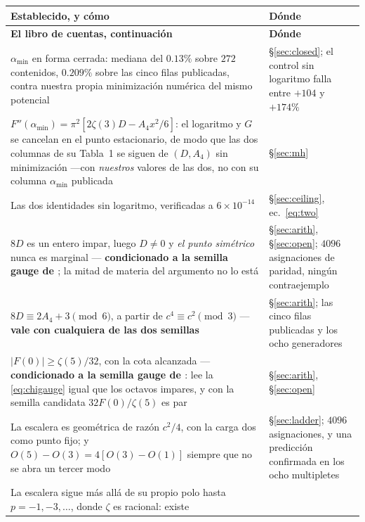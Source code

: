 \documentclass[11pt,a4paper]{article}
\newcommand{\amin}{\alpha_{\min}}
\begin{document}
\begin{longtable}{p{}p{}}
\toprule
\rowcolor{okgreen!12}\textbf{Establecido, y cómo} & \textbf{Dónde}\\
\midrule
\endfirsthead
\toprule
\textbf{El libro de cuentas, continuación} & \textbf{Dónde}\\
\midrule
\endhead
$\amin$ en forma cerrada: mediana del $0.13\%$ sobre $272$ contenidos, $0.209\%$ sobre las cinco
filas publicadas, contra nuestra propia minimización numérica del mismo potencial &
\S\ref{sec:closed}; el control sin logaritmo falla entre $+104$ y $+174\%$\\
$F''(\amin)=\pi^2[2\zeta(3)D-A_4x^2/6]$: el logaritmo y $G$ se cancelan en el punto estacionario, de
modo que las dos columnas de su Tabla~1 se siguen de $(D,A_4)$ sin minimización ---con
\emph{nuestros} valores de las dos, no con su columna $\amin$ publicada &
\S\ref{sec:mh}\\
Las dos identidades sin logaritmo, verificadas a $6\times10^{-14}$ &
\S\ref{sec:ceiling}, ec.~\eqref{eq:two}\\
$8D$ es un entero impar, luego $D\ne0$ y \emph{el punto simétrico} nunca es marginal ---
\textbf{condicionado a la semilla gauge de \cite{KM25}}; la mitad de materia del argumento no lo
está & \S\ref{sec:arith}, \S\ref{sec:open}; $4096$ asignaciones de paridad, ningún contraejemplo\\
$8D\equiv2A_4+3\pmod6$, a partir de $c^4\equiv c^2\pmod3$ --- \textbf{vale con cualquiera de las
dos semillas} & \S\ref{sec:arith}; las cinco filas publicadas y los ocho generadores\\
$|F(0)|\ge\zeta(5)/32$, con la cota alcanzada ---\textbf{condicionado a la semilla gauge de
\cite{KM25}}: lee la \eqref{eq:chigauge} igual que los octavos impares, y con la semilla candidata
$32F(0)/\zeta(5)$ es par & \S\ref{sec:arith}, \S\ref{sec:open}\\
La escalera es geométrica de razón $c^2/4$, con la carga dos como punto fijo; y
$O(5)-O(3)=4[O(3)-O(1)]$ siempre que no se abra un tercer modo & \S\ref{sec:ladder}; $4096$
asignaciones, y una predicción confirmada en los ocho multipletes\\
La escalera sigue más allá de su propio polo hasta $p=-1,-3,\dots$, donde $\zeta$ es racional: existe

\end{longtable}
\end{document}
